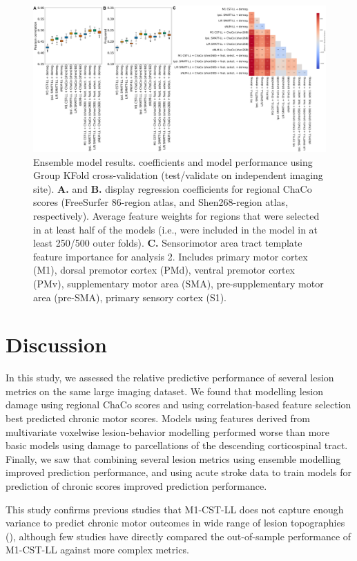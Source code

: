 \documentclass[10pt]{article}
\begin{document}
\begin{figure}[htp]
\centering
\includegraphics[width=1\linewidth]{figures/Analysis2.png}
\caption{Ensemble model results. coefficients and model performance using Group KFold cross-validation (test/validate on independent imaging site). \textbf{A.} and \textbf{B.} display regression coefficients for regional ChaCo scores (FreeSurfer 86-region atlas, and Shen268-region atlas, respectively). Average feature weights for regions that were selected in at least half of the models (i.e., were included in the model in at least 250/500 outer folds). \textbf{C.} Sensorimotor area tract template feature importance for analysis 2. Includes primary motor cortex (M1), dorsal premotor cortex (PMd), ventral premotor cortex (PMv), supplementary motor area (SMA), pre-supplementary motor area (pre-SMA), primary sensory cortex (S1).}
\label{nemotool}
\end{figure}

\section{Discussion}
In this study, we assessed the relative predictive performance of several lesion metrics on the same large imaging dataset. We found that modelling lesion damage using regional ChaCo scores and using correlation-based feature selection best predicted chronic motor scores. Models using features derived from multivariate voxelwise lesion-behavior modelling performed worse than more basic models using damage to parcellations of the descending corticospinal tract. Finally, we saw that combining several lesion metrics using ensemble modelling improved prediction performance, and using acute stroke data to train models for prediction of chronic scores improved prediction performance. 

This study confirms previous studies that M1-CST-LL does not capture enough variance to predict chronic motor outcomes in wide range of lesion topographies (\cite{Rondina2017-ij, Park2016-te, Ito2022-em, Boyd2017-gs}), although few studies have directly compared the out-of-sample performance of M1-CST-LL against more complex metrics. 
\end{document}
